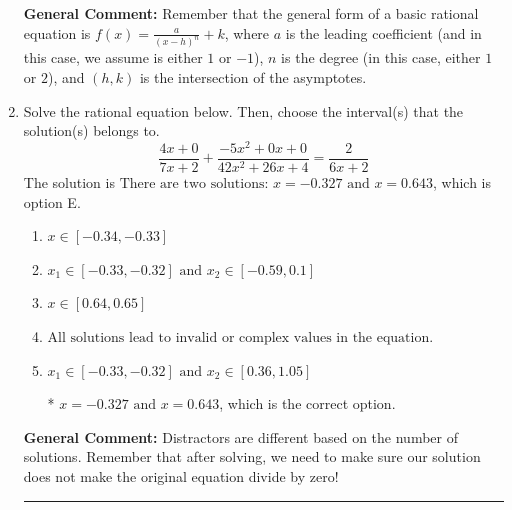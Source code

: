 \documentclass{extbook}[14pt]
\newcommand{\litem}[1]{\item #1

\rule{\textwidth}{0.4pt}}
\begin{document}
\begin{enumerate}
{\textbf{General Comment:} Remember that the general form of a basic rational equation is $ f(x) = \frac{a}{(x-h)^n} + k$, where $a$ is the leading coefficient (and in this case, we assume is either $1$ or $-1$), $n$ is the degree (in this case, either $1$ or $2$), and $(h, k)$ is the intersection of the asymptotes.
}
\litem{
Solve the rational equation below. Then, choose the interval(s) that the solution(s) belongs to.
\[ \frac{4x + 0}{7x + 2} + \frac{-5x^{2} +0 x + 0}{42x^{2} +26 x + 4} = \frac{2}{6x + 2} \]The solution is \( \text{There are two solutions: } x = -0.327 \text{ and } x = 0.643 \), which is option E.\begin{enumerate}[label=\Alph*.]
\item \( x \in [-0.34,-0.33] \)


\item \( x_1 \in [-0.33, -0.32] \text{ and } x_2 \in [-0.59,0.1] \)


\item \( x \in [0.64,0.65] \)


\item \( \text{All solutions lead to invalid or complex values in the equation.} \)


\item \( x_1 \in [-0.33, -0.32] \text{ and } x_2 \in [0.36,1.05] \)

* $x = -0.327 \text{ and } x = 0.643$, which is the correct option.
\end{enumerate}

\textbf{General Comment:} Distractors are different based on the number of solutions. Remember that after solving, we need to make sure our solution does not make the original equation divide by zero!
}
\end{enumerate}
\end{document}
